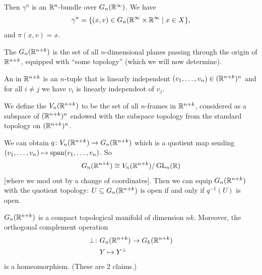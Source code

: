 \begin{node}
Then $\gamma^{n}$ is an $\mathbb{R}^{n}$-bundle over $G_{n}(\mathbb{R}^{\infty})$.
We have
\begin{equation}
\gamma^{n}=\{(x,v)\in G_{n}(\mathbb{R}^{\infty}\times\mathbb{R}^{\infty}\mid x\in X\},
\end{equation}
and $\pi(x,v)=x$.
\end{node}

\begin{definition}
The  $G_{n}(\mathbb{R}^{n+k})$ is the set of all
$n$-dimensional planes passing through the origin of $\mathbb{R}^{n+k}$,
equipped with ``some topology'' (which we will now determine).
\end{definition}

\begin{definition}
An  in $\mathbb{R}^{n+k}$ is an $n$-tuple that is linearly
independent $(v_{1},\dots,v_{n})\in(\mathbb{R}^{n+k})^{n}$ and for all $i\neq j$
we have $v_{i}$ is linearly independeot of $v_{j}$.
\end{definition}

\begin{definition}
We define the 
$V_{n}(\mathbb{R}^{n+k})$ to be the set of all $n$-frames in
$\mathbb{R}^{n+k}$, considered as a subspace of $(\mathbb{R}^{n+k})^{n}$ endowed
with the subspace topology from the standard topology on $(\mathbb{R}^{n+k})^{n}$.
\end{definition}

\begin{fact}
We can obtain $q\colon V_{n}(\mathbb{R}^{n+k})\to G_{n}(\mathbb{R}^{n+k})$ which is
a quotient map sending $(v_{1},\dots,v_{n})\mapsto\operatorname{span}(v_{1},\dots,v_{n})$.
So
\begin{equation}
G_{n}(\mathbb{R}^{n+k})\cong V_{n}(\mathbb{R}^{n+k})/\operatorname{GL}_{n}(\mathbb{R})
\end{equation}
[where we mod out by a change of coordinates]. Then we can equip
$G_{n}(\mathbb{R}^{n+k})$ with the quotient topology:
$U\subseteq G_{n}(\mathbb{R}^{n+k})$ is open if and only if $q^{-1}(U)$ is open.
\end{fact}

\begin{lemma}
$G_{n}(\mathbb{R}^{n+k})$ is a compact topological manifold of dimension $nk$.
Moreover, the orthogonal complement operation
\begin{align*}
\perp\colon & G_{n}(\mathbb{R}^{n+k})\to G_{k}(\mathbb{R}^{n+k})\\
& Y\mapsto Y^{\perp}
\end{align*}
is a homeomorphism. (These are 2 claims.)
\end{lemma}


